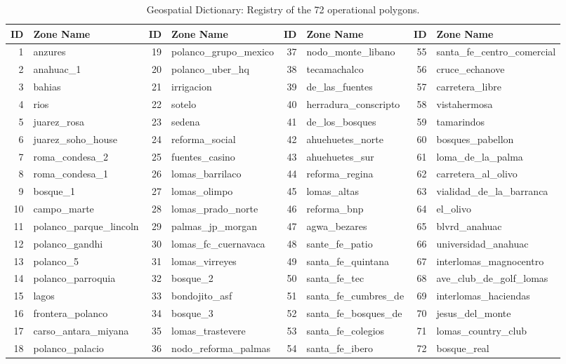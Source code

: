 \begin{table}[H]
    \centering
    \fontsize{6.5}{7.5}\selectfont %
    \setlength{\tabcolsep}{3pt}    %
    \begin{tabular}{rl | rl | rl | rl}
        \toprule
        \textbf{ID} & \textbf{Zone Name} & \textbf{ID} & \textbf{Zone Name} & \textbf{ID} & \textbf{Zone Name} & \textbf{ID} & \textbf{Zone Name} \\
        \midrule
        1 & anzures & 19 & polanco\_grupo\_mexico & 37 & nodo\_monte\_libano & 55 & santa\_fe\_centro\_comercial \\
        2 & anahuac\_1 & 20 & polanco\_uber\_hq & 38 & tecamachalco & 56 & cruce\_echanove \\
        3 & bahias & 21 & irrigacion & 39 & de\_las\_fuentes & 57 & carretera\_libre \\
        4 & rios & 22 & sotelo & 40 & herradura\_conscripto & 58 & vistahermosa \\
        5 & juarez\_rosa & 23 & sedena & 41 & de\_los\_bosques & 59 & tamarindos \\
        6 & juarez\_soho\_house & 24 & reforma\_social & 42 & ahuehuetes\_norte & 60 & bosques\_pabellon \\
        7 & roma\_condesa\_2 & 25 & fuentes\_casino & 43 & ahuehuetes\_sur & 61 & loma\_de\_la\_palma \\
        8 & roma\_condesa\_1 & 26 & lomas\_barrilaco & 44 & reforma\_regina & 62 & carretera\_al\_olivo \\
        9 & bosque\_1 & 27 & lomas\_olimpo & 45 & lomas\_altas & 63 & vialidad\_de\_la\_barranca \\
        10 & campo\_marte & 28 & lomas\_prado\_norte & 46 & reforma\_bnp & 64 & el\_olivo \\
        11 & polanco\_parque\_lincoln & 29 & palmas\_jp\_morgan & 47 & agwa\_bezares & 65 & blvrd\_anahuac \\
        12 & polanco\_gandhi & 30 & lomas\_fc\_cuernavaca & 48 & sante\_fe\_patio & 66 & universidad\_anahuac \\
        13 & polanco\_5 & 31 & lomas\_virreyes & 49 & santa\_fe\_quintana & 67 & interlomas\_magnocentro \\
        14 & polanco\_parroquia & 32 & bosque\_2 & 50 & santa\_fe\_tec & 68 & ave\_club\_de\_golf\_lomas \\
        15 & lagos & 33 & bondojito\_asf & 51 & santa\_fe\_cumbres\_de & 69 & interlomas\_haciendas \\
        16 & frontera\_polanco & 34 & bosque\_3 & 52 & santa\_fe\_bosques\_de & 70 & jesus\_del\_monte \\
        17 & carso\_antara\_miyana & 35 & lomas\_trastevere & 53 & santa\_fe\_colegios & 71 & lomas\_country\_club \\
        18 & polanco\_palacio & 36 & nodo\_reforma\_palmas & 54 & santa\_fe\_ibero & 72 & bosque\_real \\
        \bottomrule
    \end{tabular}
    \caption{Geospatial Dictionary: Registry of the 72 operational polygons.}
    \label{tab:zone_dictionary}
\end{table}


